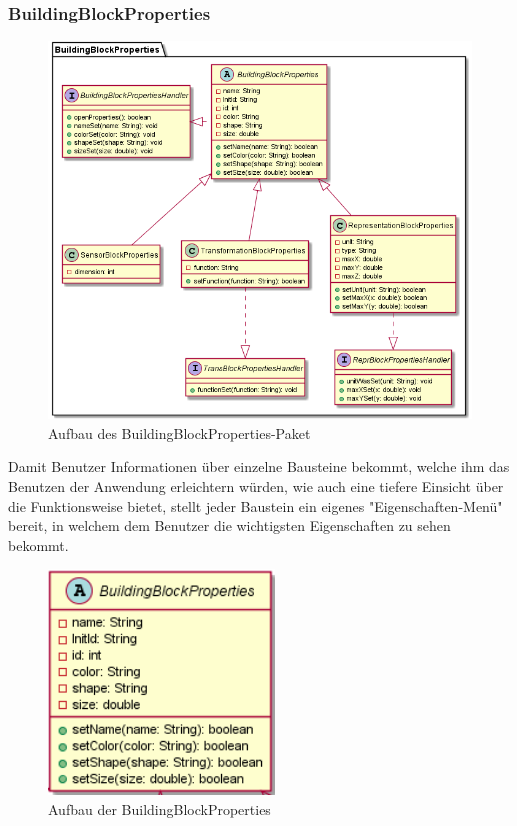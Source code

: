 \documentclass[parskip=full]{scrartcl}
\begin{document}
\newpage 

\subsubsection{BuildingBlockProperties}

\begin{figure}[htbp]
	\begin{center}
		\includegraphics[width = 14cm]{Grafiken/View/BuildingBlockPropertiesNamespace.png}
		\caption{Aufbau des BuildingBlockProperties-Paket}
		\label{Entwurf_Grob}
	\end{center}
\end{figure}

Damit Benutzer Informationen über einzelne Bausteine bekommt, welche ihm das Benutzen der Anwendung erleichtern würden, wie auch eine tiefere Einsicht über die Funktionsweise bietet, stellt jeder Baustein ein eigenes "Eigenschaften-Menü" bereit, in welchem dem Benutzer die wichtigsten Eigenschaften zu sehen bekommt.

\clearpage

\begin{figure}[htbp]
	\begin{center}
		\includegraphics[width = 6cm]{Grafiken/View/BuildingBlockProperties.png}
		\caption{Aufbau der BuildingBlockProperties}
		\label{Entwurf_Grob}
	\end{center}
\end{figure}
\end{document}
